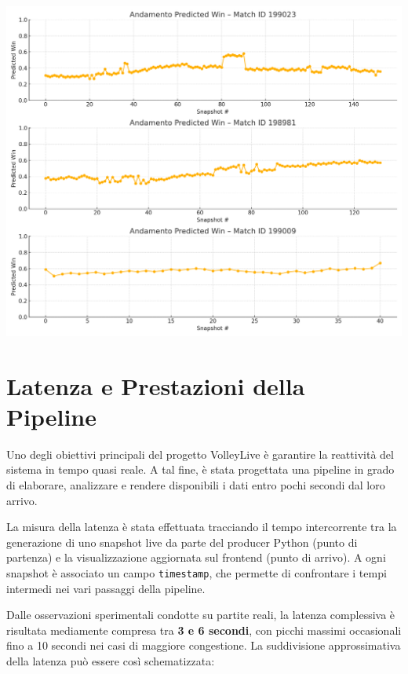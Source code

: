 \documentclass[a4paper,12pt]{report}
\begin{document}
\noindent\begin{minipage}{\textwidth}
  \centering
    \includegraphics[width=\textwidth]{andamento_predicted_win_match_simple_x.png}
    \label{fig:andamento-predicted-win}
\end{minipage}


\section{Latenza e Prestazioni della Pipeline}

Uno degli obiettivi principali del progetto VolleyLive è garantire la reattività del sistema in tempo quasi reale. A tal fine, è stata progettata una pipeline in grado di elaborare, analizzare e rendere disponibili i dati entro pochi secondi dal loro arrivo.

La misura della latenza è stata effettuata tracciando il tempo intercorrente tra la generazione di uno snapshot live da parte del producer Python (punto di partenza) e la visualizzazione aggiornata sul frontend (punto di arrivo). A ogni snapshot è associato un campo \texttt{timestamp}, che permette di confrontare i tempi intermedi nei vari passaggi della pipeline.

Dalle osservazioni sperimentali condotte su partite reali, la latenza complessiva è risultata mediamente compresa tra \textbf{3 e 6 secondi}, con picchi massimi occasionali fino a 10 secondi nei casi di maggiore congestione. La suddivisione approssimativa della latenza può essere così schematizzata:
\end{document}
